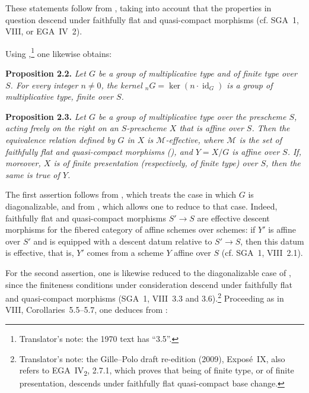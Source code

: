 These statements follow from , taking into account that the
properties in question descend under faithfully flat and quasi-compact
morphisms (cf. SGA~1, VIII, or EGA~IV~2).

Using ,\footnote{Translator's note: the 1970 text has ``3.5''.} one likewise obtains:

\medskip
\noindent{}\textbf{Proposition 2.2.}
\textit{Let \(G\) be a group of multiplicative type and of finite type over
\(S\). For every integer \(n\ne0\), the kernel
\({}_nG=\ker(n\cdot\operatorname{id}_G)\) is a group of multiplicative
type, finite over \(S\).}

\medskip
\noindent{}\textbf{Proposition 2.3.}
\textit{Let \(G\) be a group of multiplicative type over the prescheme
\(S\), acting freely on the right on an \(S\)-prescheme \(X\) that is
affine over \(S\). Then the equivalence relation defined by \(G\) in
\(X\) is \(\mathcal M\)-effective, where \(\mathcal M\) is the set of
faithfully flat and quasi-compact morphisms
(), and \(Y=X/G\) is affine
over \(S\). If, moreover, \(X\) is of finite presentation (respectively,
of finite type) over \(S\), then the same is true of \(Y\).}

The first assertion follows from , which treats the case in which
\(G\) is diagonalizable, and from , which allows one to reduce to
that case. Indeed, faithfully flat and quasi-compact morphisms
\(S'\to S\) are effective descent morphisms for the fibered category of
affine schemes over schemes: if \(Y'\) is affine over \(S'\) and is
equipped with a descent datum relative to \(S'\to S\), then this datum is
effective, that is, \(Y'\) comes from a scheme \(Y\) affine over \(S\)
(cf. SGA~1, VIII~2.1).

For the second assertion, one is likewise reduced to the diagonalizable
case of , since the finiteness conditions under consideration
descend under faithfully flat and quasi-compact morphisms (SGA~1,
VIII~3.3 and 3.6).\footnote{Translator's note: the Gille--Polo draft re-edition (2009), Expos\'e~IX, also refers to EGA~IV\textsubscript{2}, 2.7.1, which proves that being of finite type, or of finite presentation, descends under faithfully flat quasi-compact base change.} Proceeding as in VIII,
Corollaries~5.5--5.7, one deduces from
:

